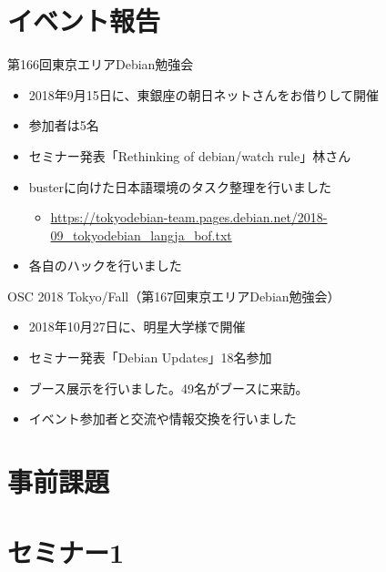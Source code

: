 \section{イベント報告}

\begin{frame}{第166回東京エリアDebian勉強会}
\begin{itemize}
\item 2018年9月15日に、東銀座の朝日ネットさんをお借りして開催
\item 参加者は5名
\item セミナー発表「Rethinking of debian/watch rule」林さん
\item busterに向けた日本語環境のタスク整理を行いました
  \begin{itemize}
    \item \url{https://tokyodebian-team.pages.debian.net/2018-09_tokyodebian_langja_bof.txt}
  \end{itemize}
\item 各自のハックを行いました
\end{itemize} 
\end{frame}

\begin{frame}{OSC 2018 Tokyo/Fall（第167回東京エリアDebian勉強会）}
\begin{itemize}
\item 2018年10月27日に、明星大学様で開催
\item セミナー発表「Debian Updates」18名参加
\item ブース展示を行いました。49名がブースに来訪。
\item イベント参加者と交流や情報交換を行いました
\end{itemize} 
\end{frame}


\section{事前課題}


{\footnotesize
 
}

%

\section{セミナー1}

